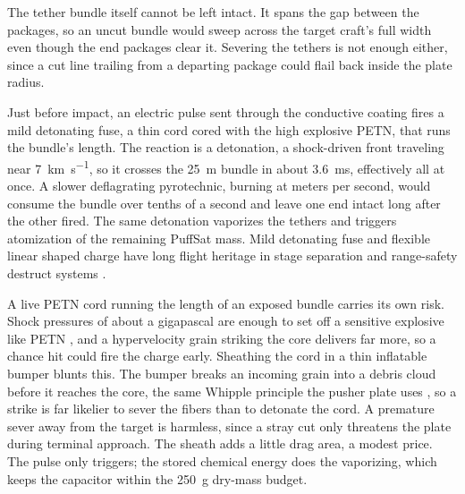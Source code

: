 \documentclass{article}
\begin{document}
The tether bundle itself cannot be left intact. It spans the gap between the packages, so an uncut bundle would sweep across the target craft's full width even though the end packages clear it. Severing the tethers is not enough either, since a cut line trailing from a departing package could flail back inside the plate radius.

Just before impact, an electric pulse sent through the conductive coating fires a mild detonating fuse, a thin cord cored with the high explosive PETN, that runs the bundle's length. The reaction is a detonation, a shock-driven front traveling near \SI{7}{\kilo\meter\per\second}, so it crosses the \SI{25}{\meter} bundle in about \SI{3.6}{\milli\second}, effectively all at once. A slower deflagrating pyrotechnic, burning at meters per second, would consume the bundle over tenths of a second and leave one end intact long after the other fired. The same detonation vaporizes the tethers and triggers atomization of the remaining PuffSat mass. Mild detonating fuse and flexible linear shaped charge have long flight heritage in stage separation and range-safety destruct systems \cite{bement_pyro_manual}.

A live PETN cord running the length of an exposed bundle carries its own risk. Shock pressures of about a gigapascal are enough to set off a sensitive explosive like PETN \cite{souers_thresholds}, and a hypervelocity grain striking the core delivers far more, so a chance hit could fire the charge early. Sheathing the cord in a thin inflatable bumper blunts this. The bumper breaks an incoming grain into a debris cloud before it reaches the core, the same Whipple principle the pusher plate uses \cite{whipple_shield}, so a strike is far likelier to sever the fibers than to detonate the cord. A premature sever away from the target is harmless, since a stray cut only threatens the plate during terminal approach. The sheath adds a little drag area, a modest price. The pulse only triggers; the stored chemical energy does the vaporizing, which keeps the capacitor within the \SI{250}{\gram} dry-mass budget.
\end{document}
